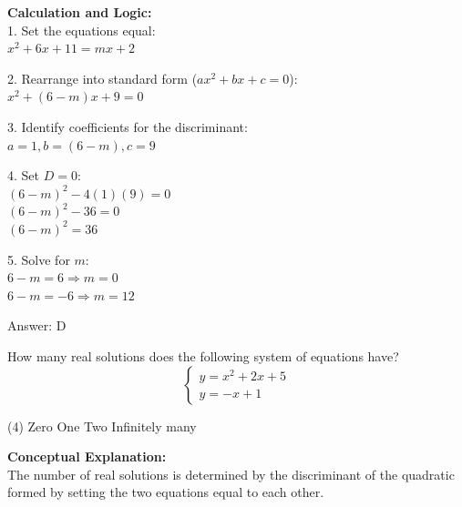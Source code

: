 \documentclass[11pt,paper=a4,answers]{exam}
\begin{document}
\begin{questions}
\begin{solution}
\vspace{20pt}

\textbf{Calculation and Logic:} \\
1. Set the equations equal: \\
   $x^2 + 6x + 11 = mx + 2$

\vspace{10pt}

2. Rearrange into standard form ($ax^2 + bx + c = 0$): \\
   $x^2 + (6 - m)x + 9 = 0$

\vspace{10pt}

3. Identify coefficients for the discriminant: \\
   $a = 1, b = (6 - m), c = 9$

\vspace{10pt}

4. Set $D = 0$: \\
   $(6 - m)^2 - 4(1)(9) = 0$ \\
   $(6 - m)^2 - 36 = 0$ \\
   $(6 - m)^2 = 36$

\vspace{10pt}

5. Solve for $m$: \\
   $6 - m = 6 \Rightarrow m = 0$ \\
   $6 - m = -6 \Rightarrow m = 12$

\vspace{25pt}

Answer: \colorbox{yellow!100}{D}
\end{solution}

\vspace{40pt}

\question
How many real solutions does the following system of equations have?
\[ \begin{cases} y = x^2 + 2x + 5 \\ y = -x + 1 \end{cases} \]
\begin{tasks}(4)
    \task Zero
    \task One
    \task Two
    \task Infinitely many
\end{tasks}

\begin{solution}
\textbf{Conceptual Explanation:} \\
The number of real solutions is determined by the discriminant of the quadratic formed by setting the two equations equal to each other.


\end{solution}
\end{questions}
\end{document}
